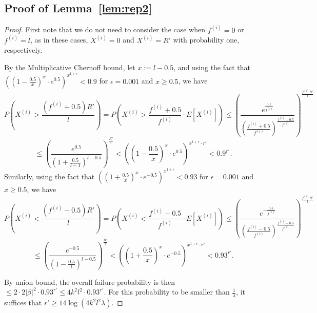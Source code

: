 \documentclass[10pt,a4paper]{amsart}
\begin{document}
\subsection{Proof of Lemma~\ref{lem:rep2}}
\begin{proof}
    First note that we do not need to consider the case when $f^{(i)}=0$ or $f^{(i)}=l$, as in these cases, $X^{(i)}=0$ and $X^{(i)}=R'$ with probability one, respectively. 
    
    By the Multiplicative Chernoff bound, let $x:=l-0.5$, and using the fact that $((1-\frac{0.5}{x})^x\cdot e^{0.5})^{x^{1+\epsilon}}<0.9$ for $\epsilon=0.001$ and $x\geq0.5$, we have
    \[P\left(X^{(i)}>\frac{(f^{(i)}+0.5)R'}{l}\right)=P\left(X^{(i)}>\frac{f^{(i)}+0.5}{f^{(i)}}\cdot E[X^{(i)}]\right)\leq\left(\frac{e^{\frac{0.5}{f^{(i)}}}}{(\frac{f^{(i)}+0.5}{f^{(i)}})^{\frac{f^{(i)}+0.5}{f^{(i)}}}}\right)^{\frac{f^{(i)}R'}{l}}\]
    \[\leq \left(\frac{e^{0.5}}{(1+\frac{0.5}{l-1})^{l-0.5}}\right)^\frac{R'}{l}<\left(\left(1-\frac{0.5}{x}\right)^x\cdot e^{0.5}\right)^{x^{1+\epsilon}\cdot r'}<0.9^{r'}.\]
    Similarly, using the fact that $((1+\frac{0.5}{x})^x\cdot e^{-0.5})^{x^{1+\epsilon}}<0.93$ for $\epsilon=0.001$ and $x\geq0.5$, we have
    \[
    P\left(X^{(i)}<\frac{(f^{(i)}-0.5)R'}{l}\right)=P\left(X^{(i)}<\frac{f^{(i)}-0.5}{f^{(i)}}\cdot E[X^{(i)}]\right)\leq\left(\frac{e^{-\frac{0.5}{f^{(i)}}}}{(\frac{f^{(i)}-0.5}{f^{(i)}})^{\frac{f^{(i)}-0.5}{f^{(i)}}}}\right)^{\frac{f^{(i)}R'}{l}}\]
    \[\leq \left(\frac{e^{-0.5}}{(1-\frac{0.5}{l})^{l-0.5}}\right)^\frac{R'}{l}<\left(\left(1+\frac{0.5}{x}\right)^{x}\cdot e^{-0.5}\right)^{x^{1+\epsilon}\cdot r'}<0.93^{r'}.
    \]
    
    By union bound, the overall failure probability is then $\leq 2\cdot 2|\beta|^2\cdot 0.93^{r'}\leq 4k^2l^2\cdot 0.93^{r'}$. For this probability to be smaller than $\frac{1}{\lambda}$, it suffices that $r'\geq 14\log(4k^2l^2\lambda)$. 
\end{proof}
\end{document}
